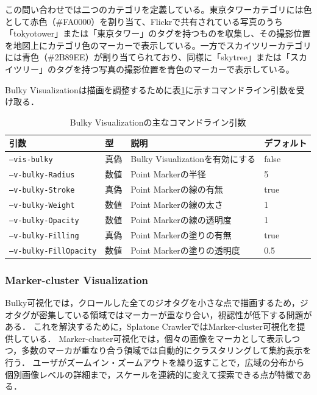 この問い合わせでは二つのカテゴリを定義している。東京タワーカテゴリには色として\textcolor[HTML]{FA0000}{赤色（\#FA0000）}を割り当て、Flickrで共有されている写真のうち「tokyotower」または「東京タワー」のタグを持つものを収集し、その撮影位置を地図上にカテゴリ色のマーカーで表示している。一方でスカイツリーカテゴリには\textcolor[HTML]{2B89EE}{青色（\#2B89EE）}が割り当てられており、同様に「skytree」または「スカイツリー」のタグを持つ写真の撮影位置を青色のマーカーで表示している。

Bulky Visualizationは描画を調整するために表\ref{tab:bulky_params}に示すコマンドライン引数を受け取る．

\begin{table}[h]
\centering\small
\caption{Bulky Visualizationの主なコマンドライン引数}
\label{tab:bulky_params}
\begin{tabular}{llll}
\hline
引数 & 型 & 説明 & デフォルト \\
\hline
	\texttt{--vis-bulky} & 真偽 & Bulky Visualizationを有効にする & false \\
	\texttt{--v-bulky-Radius} & 数値 & Point Markerの半径 & 5 \\
	\texttt{--v-bulky-Stroke} & 真偽 & Point Markerの線の有無 & true \\
	\texttt{--v-bulky-Weight} & 数値 & Point Markerの線の太さ & 1 \\
	\texttt{--v-bulky-Opacity} & 数値 & Point Markerの線の透明度 & 1 \\
	\texttt{--v-bulky-Filling} & 真偽 & Point Markerの塗りの有無 & true \\
	\texttt{--v-bulky-FillOpacity} & 数値 & Point Markerの塗りの透明度 & 0.5 \\
\hline
\end{tabular}
\end{table} 

\subsubsection{Marker-cluster Visualization}
Bulky可視化では，クロールした全てのジオタグを小さな点で描画するため，ジオタグが密集している領域ではマーカーが重なり合い，視認性が低下する問題がある．
これを解決するために，Splatone CrawlerではMarker-cluster可視化を提供している．
Marker-cluster可視化では，個々の画像をマーカとして表示しつつ，多数のマーカが重なり合う領域では自動的にクラスタリングして集約表示を行う．
ユーザがズームイン・ズームアウトを繰り返すことで，広域の分布から個別画像レベルの詳細まで，スケールを連続的に変えて探索できる点が特徴である．

